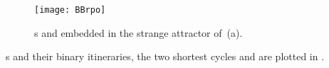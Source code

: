 

\begin{figure}%
  \begin{center}
  \texttt{[image: BBrpo]}
  \end{center}
  \caption{
	\Rpo s  and  embedded in the strange attractor
    of \,(a).
    }
  \label{fig:BBrpo1-01}
\end{figure}

\rpo s and their binary itineraries, the two shortest cycles
 and  are plotted in
.
